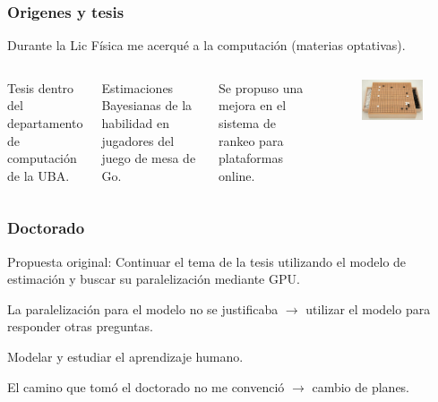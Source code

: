 \documentclass[handout]{beamer}
\begin{document}
\begin{frame}
\frametitle{Origenes y tesis}

 Durante la Lic Física me acerqué a la computación (materias optativas).
\begin{columns}
\vspace{0.5cm}

Tesis dentro del departamento de computación de la UBA.
\vspace{0.5cm}

Estimaciones Bayesianas de la habilidad en jugadores del juego de mesa de Go.

\vspace{0.5cm}
Se propuso una mejora en el sistema de rankeo para plataformas online.
\begin{figure}[h!]
    \centering
    \includegraphics[scale=2.]{go.jpg}
\end{figure}
\end{columns}
\end{frame}

\begin{frame}
\frametitle{Doctorado}
Propuesta original: Continuar el tema de la tesis utilizando el modelo de estimación y buscar su paralelización mediante GPU.

La paralelización para el modelo no se justificaba $\rightarrow$ utilizar el modelo para responder otras preguntas.

Modelar y estudiar el aprendizaje humano.

El camino que tomó el doctorado  no me convenció $\to$ cambio de planes.



\end{frame}
\end{document}
